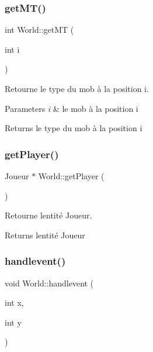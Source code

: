 \subsubsection{\texorpdfstring{get\+M\+T()}{getMT()}}
{\footnotesize\ttfamily int World\+::get\+MT (\begin{DoxyParamCaption}\item[{int}]{i }\end{DoxyParamCaption})}



Retourne le type du mob à la position i. 


\begin{DoxyParams}{Parameters}
{\em i} & le mob à la position i \\
\hline
\end{DoxyParams}
\begin{DoxyReturn}{Returns}
le type du mob à la position i 
\end{DoxyReturn}
\mbox{\label{classWorld_a529077baf90f8f90b3d5b286bfa69490}} 
\subsubsection{\texorpdfstring{get\+Player()}{getPlayer()}}
{\footnotesize\ttfamily Joueur $\ast$ World\+::get\+Player (\begin{DoxyParamCaption}{ }\end{DoxyParamCaption})}



Retourne l\textquotesingle{}entité Joueur. 

\begin{DoxyReturn}{Returns}
l\textquotesingle{}entité Joueur 
\end{DoxyReturn}
\mbox{\label{classWorld_aafe1304ddcf960c1bb02f76a39499355}} 
\subsubsection{\texorpdfstring{handlevent()}{handlevent()}}
{\footnotesize\ttfamily void World\+::handlevent (\begin{DoxyParamCaption}\item[{int}]{x,  }\item[{int}]{y }\end{DoxyParamCaption})}



